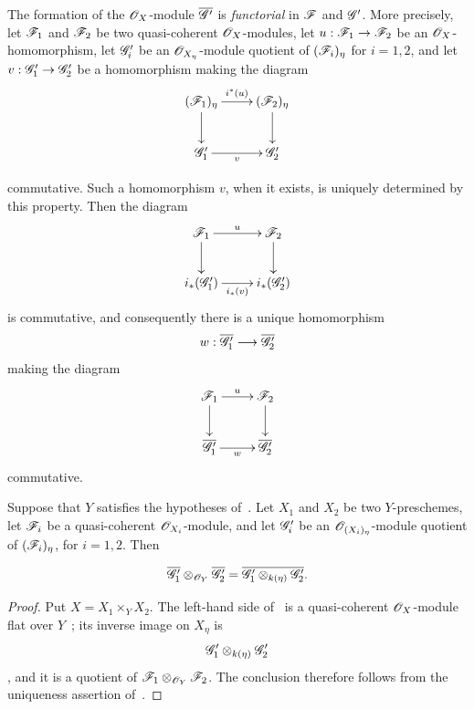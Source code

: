\begin{env}[2.8.3]
\label{IV.2.8.3}
The formation of the $\mathscr{O}_X$-module $\overline{\mathscr{G}'}$ is
\emph{functorial} in $\mathscr{F}$ and $\mathscr{G}'$. More precisely, let
$\mathscr{F}_1$ and $\mathscr{F}_2$ be two quasi-coherent
$\mathscr{O}_X$-modules, let
$u:\mathscr{F}_1\to\mathscr{F}_2$ be an $\mathscr{O}_X$-homomorphism, let
$\mathscr{G}'_i$ be an $\mathscr{O}_{X_\eta}$-module quotient of
$(\mathscr{F}_i)_\eta$ for $i=1,2$, and let
$v:\mathscr{G}'_1\to\mathscr{G}'_2$ be a homomorphism making the diagram
\[
\xymatrix{
  (\sh{F}_1)_\eta \ar[r]^{i^*(u)} \ar[d]
    &(\sh{F}_2)_\eta \ar[d] \\
  \sh{G}'_1 \ar[r]_v
    &\sh{G}'_2
}
\]


commutative. Such a homomorphism $v$, when it exists, is uniquely
determined by this property. Then the diagram
\[
\xymatrix{
  \sh{F}_1 \ar[r]^u \ar[d]
    &\sh{F}_2 \ar[d] \\
  i_*(\sh{G}'_1) \ar[r]_{i_*(v)}
    &i_*(\sh{G}'_2)
}
\]
is commutative, and consequently there is a unique homomorphism
\[
  w:\overline{\mathscr{G}'_1}\longrightarrow\overline{\mathscr{G}'_2}
\]
making the diagram
\[
\xymatrix{
  \sh{F}_1 \ar[r]^u \ar[d]
    &\sh{F}_2 \ar[d] \\
  \overline{\sh{G}'_1} \ar[r]_w
    &\overline{\sh{G}'_2}
}
\]
commutative.
\end{env}

\begin{proposition}[2.8.4]
\label{IV.2.8.4}
Suppose that $Y$ satisfies the hypotheses of~. Let
$X_1$ and $X_2$ be two $Y$-preschemes, let $\mathscr{F}_i$ be a
quasi-coherent $\mathscr{O}_{X_i}$-module, and let $\mathscr{G}'_i$ be an
$\mathscr{O}_{(X_i)_\eta}$-module quotient of $(\mathscr{F}_i)_\eta$, for
$i=1,2$. Then
\end{proposition}

\begin{env}[2.8.4.1]
\label{IV.2.8.4.1}
\[
  \overline{\mathscr{G}'_1}\otimes_{\mathscr{O}_Y}\overline{\mathscr{G}'_2}
    =
  \overline{\mathscr{G}'_1\otimes_{k(\eta)}\mathscr{G}'_2}.
\]
\end{env}

\begin{proof}
Put $X=X_1\times_Y X_2$. The left-hand side
of~ is a quasi-coherent $\mathscr{O}_X$-module flat over
$Y$~; its inverse image on $X_\eta$ is
\[
  \mathscr{G}'_1\otimes_{k(\eta)}\mathscr{G}'_2
\]
, and it is a quotient of
$\mathscr{F}_1\otimes_{\mathscr{O}_Y}\mathscr{F}_2$. The conclusion therefore
follows from the uniqueness assertion of~.
\end{proof}

